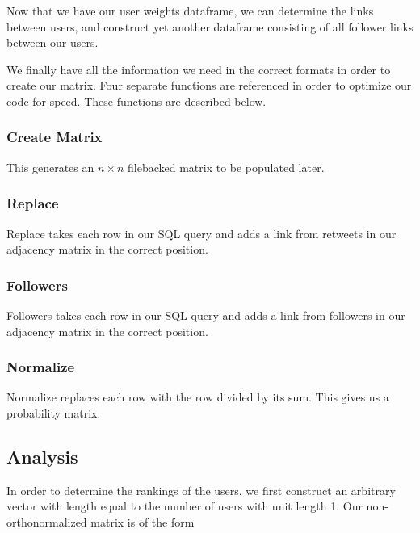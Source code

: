     Now that we have our user weights dataframe, we can determine the links between users, and construct yet another dataframe consisting of all follower links between our users.


    We finally have all the information we need in the correct formats in order to create our matrix. Four separate functions are referenced in order to optimize our code for speed. These functions are described below.


        \subsubsection{Create Matrix}

        This generates an $n \times n$ filebacked matrix to be populated later.

        \subsubsection{Replace}

        Replace takes each row in our SQL query and adds a link from retweets in our adjacency matrix in the correct position.

        \subsubsection{Followers}

        Followers takes each row in our SQL query and adds a link from followers in our adjacency matrix in the correct position.

        \subsubsection{Normalize}

        Normalize replaces each row with the row divided by its sum. This gives us a probability matrix.

    \subsection{Analysis}
    In order to determine the rankings of the users, we first construct an arbitrary vector with length equal to the number of users with unit length 1. Our non-orthonormalized matrix is of the form

